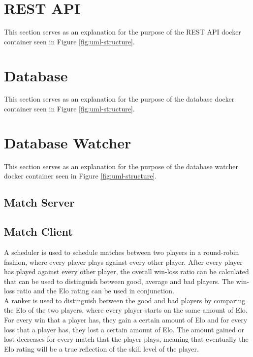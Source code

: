 \documentclass[a4paper, 12pt]{report}
\begin{document}
\section{REST API}

This section serves as an explanation for the purpose of the REST API docker
container seen in Figure \ref{fig:uml-structure}. \\

\section{Database}

This section serves as an explanation for the purpose of the database docker
container seen in Figure \ref{fig:uml-structure}. \\

\section{Database Watcher}

This section serves as an explanation for the purpose of the database watcher
docker container seen in Figure \ref{fig:uml-structure}. \\

\subsection{Match Server}

\subsection{Match Client}

A scheduler is used to schedule matches between two players in a round-robin
\mbox{fashion}, where every player plays against every other player. After every player
has played against every other player, the overall win-loss ratio can be calculated
that can be used to \mbox{distinguish} between good, average and bad players. The
win-loss ratio and the Elo rating \cite{elo} can be used in conjunction. \\

A ranker is used to distinguish between the good and bad players by comparing
the Elo of the two players, where every player starts on the same amount of Elo.
For every win that a player has, they gain a certain amount of Elo and for every
loss that a player has, they lost a certain amount of Elo. The amount gained or
lost decreases for every match that the player plays, meaning that eventually
the Elo rating will be a true reflection of the skill level of the player. \\
\end{document}

